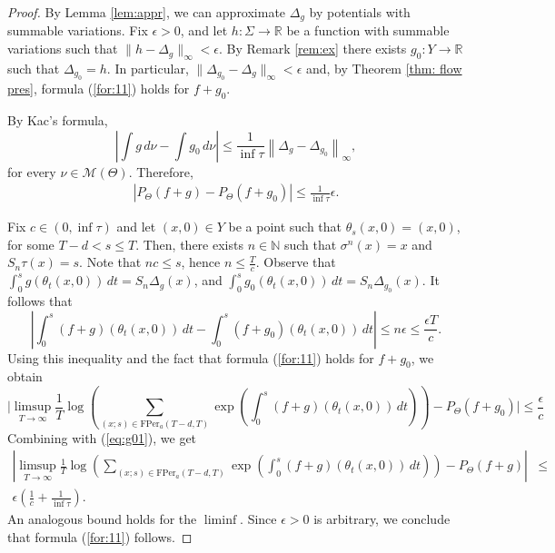 \documentclass[letterpaper,11pt]{amsart}
\numberwithin{equation}{section}     %
\newcommand{\M}{\mathcal{M}}
\newcommand{\R}{\mathbb{R}}
\def\R{{\mathbb R}}
\def\M{{\mathcal M}}
\def\le{\leqslant}
\def\M{\mathcal{M}}
\begin{document}
\begin{proof}  By Lemma \ref{lem:appr}, we can approximate $\Delta_g$ by potentials with summable variations. Fix $\epsilon>0$, and let $h:\Sigma\to\mathbb{R}$ be a function with summable variations such that $\|h - \Delta_g\|_\infty < \epsilon$. By Remark \ref{rem:ex} there exists  $g_0 :Y\to\R$ such that $\Delta_{g_0} = h$.  In particular, $\|\Delta_{g_0}- \Delta_g\|_\infty < \epsilon$ and,  by Theorem \ref{thm: flow pres}, formula (\ref{for:11}) holds for $f+g_0$.

By Kac's formula, 
$$\left|\int g \, d\nu -\int g_0  \, d\nu \right| \le \frac{1}{\inf \tau}\left\|\Delta_g-\Delta_{g_0} \right\|_\infty,$$ 
for every $\nu\in\M(\Theta)$. Therefore, 
\begin{align}\label{eq:g01}
\left|P_\Theta(f+g)-P_\Theta(f+g_0) \right|\le \frac{1}{\inf \tau}\epsilon.
\end{align}

Fix $c \in (0, \inf \tau)$ and let $(x, 0) \in Y$ be a point such that $\theta_s(x, 0) = (x, 0)$, for some $T-d < s \le T$. Then,  there exists $n \in \mathbb{N}$ such that $\sigma^n(x) = x$ and $S_n \tau(x) = s$. Note that $nc \le s$, hence $n \le \frac{T}{c}$. Observe that 
$\int_0^s g(\theta_t(x,0)) \, dt=S_n\Delta_g(x)$, and $\int_0^s g_0(\theta_t(x,0)) \, dt=S_n \Delta_{g_0}(x).$ It follows that 
$$\left|\int_0^s (f+g)(\theta_t(x,0)) \, dt-\int_0^s (f+g_0)(\theta_t(x,0)) \, dt\right|\le n\epsilon\le \frac{\epsilon T}{c}.$$
Using this inequality and the fact that formula (\ref{for:11}) holds for $f+g_0$, we obtain
$$\bigg|\limsup_{T \to \infty} \frac{1}{T} \log \left(\sum_{(x;s)\in \text{FPer}_a(T-d,T)} \exp\left( \int_0^s (f+g)(\theta_t(x,0)) \, dt \right) \right)-P_\Theta(f+g_0)\bigg|\le \frac{\epsilon}{c}$$
Combining with (\ref{eq:g01}), we get
\begin{align*}
\left|\limsup_{T \to \infty} \frac{1}{T} \log \left(\sum_{(x;s)\in \text{FPer}_a(T-d,T)} \exp\left( \int_0^s (f+g)(\theta_t(x,0)) \, dt \right) \right)-P_\Theta(f+g)\right| &\le&\\ \epsilon\left(\frac{1}{c}+\frac{1}{\inf \tau}\right).
\end{align*}
An analogous bound holds for the $\liminf$. Since $\epsilon>0$ is arbitrary, we conclude that formula (\ref{for:11}) follows.
\end{proof}
\end{document}
